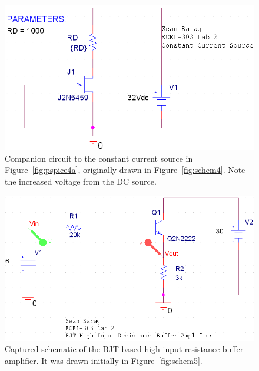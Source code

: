 \begin{figure}[H]
	\centering
	\includegraphics[width=.6\textwidth]{img/screen/constantCurrent32Shot.PNG}
	\parbox{.6\textwidth}{
	\caption[PSpice screenshot --- Constant Current Source
		(\SI{32}{\volt})]{Companion circuit to the constant current source in
		Figure~\ref{fig:pspice4a}, originally drawn in Figure~\ref{fig:schem4}.
		Note the increased voltage from the DC source.}
	\label{fig:pspice4b}}
\end{figure}

\begin{figure}[H]
	\centering
	\includegraphics[width=.6\textwidth]{img/screen/bjtShot.PNG}
	\parbox{.6\textwidth}{
	\caption[PSpice screenshot --- Buffer Amplifier]{Captured schematic of
		the BJT-based high input resistance buffer amplifier.  It was drawn
		initially in Figure~\ref{fig:schem5}.}
	\label{fig:pspice5}}
\end{figure}
